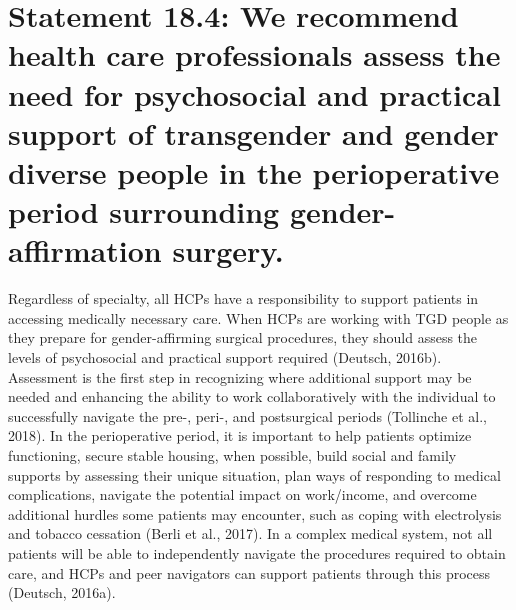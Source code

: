 \documentclass[
]{book}
\begin{document}
\hypertarget{statement-18.4-we-recommend-health-care-professionals-assess-the-need-for-psychosocial-and-practical-support-of-transgender-and-gender-diverse-people-in-the-perioperative-period-surrounding-gender-affirmation-surgery.}{%
\section*{Statement 18.4: We recommend health care professionals assess the need for psychosocial and practical support of transgender and gender diverse people in the perioperative period surrounding gender-affirmation surgery.}\label{statement-18.4-we-recommend-health-care-professionals-assess-the-need-for-psychosocial-and-practical-support-of-transgender-and-gender-diverse-people-in-the-perioperative-period-surrounding-gender-affirmation-surgery.}}

Regardless of specialty, all HCPs have a responsibility to support patients in accessing medically
necessary care. When HCPs are working with
TGD people as they prepare for gender-affirming
surgical procedures, they should assess the levels
of psychosocial and practical support required
(Deutsch, 2016b). Assessment is the first step in
recognizing where additional support may be
needed and enhancing the ability to work collaboratively with the individual to successfully
navigate the pre-, peri-, and postsurgical periods
(Tollinche et al., 2018). In the perioperative
period, it is important to help patients optimize
functioning, secure stable housing, when possible,
build social and family supports by assessing their
unique situation, plan ways of responding to
medical complications, navigate the potential
impact on work/income, and overcome additional
hurdles some patients may encounter, such as
coping with electrolysis and tobacco cessation
(Berli et al., 2017). In a complex medical system,
not all patients will be able to independently
navigate the procedures required to obtain care,
and HCPs and peer navigators can support
patients through this process (Deutsch, 2016a).
\end{document}
